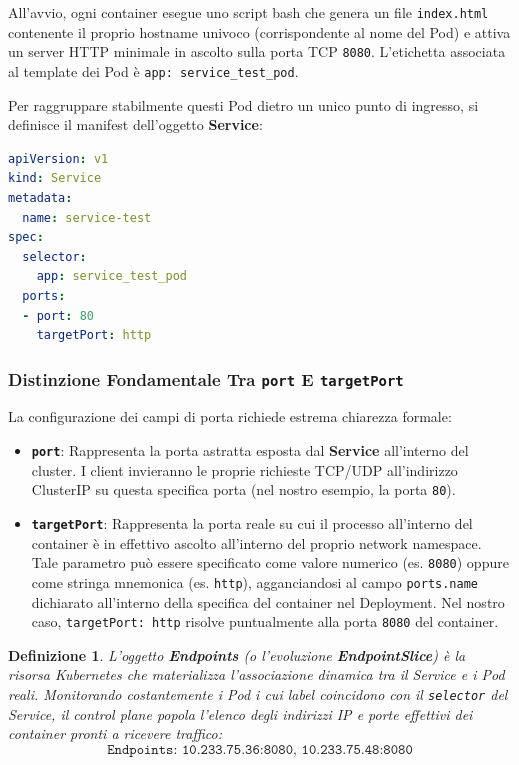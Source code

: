 \documentclass[11pt, a4paper]{article}
\newtheorem{theorem}{Definizione}
\begin{document}
All'avvio, ogni container esegue uno script bash che genera un file \texttt{index.html} contenente il proprio hostname univoco (corrispondente al nome del Pod) e attiva un server HTTP minimale in ascolto sulla porta TCP \texttt{8080}. L'etichetta associata al template dei Pod è \texttt{app: service\_test\_pod}.

Per raggruppare stabilmente questi Pod dietro un unico punto di ingresso, si definisce il manifest dell'oggetto \textbf{Service}:

\begin{lstlisting}[language=yaml, caption={Manifest del Service ClusterIP associato (\texttt{deployment-service-test.yml})}]
apiVersion: v1
kind: Service
metadata:
  name: service-test
spec:
  selector:
    app: service_test_pod
  ports:
  - port: 80
    targetPort: http
\end{lstlisting}

\subsubsection{Distinzione Fondamentale Tra \texttt{port} E \texttt{targetPort}}
La configurazione dei campi di porta richiede estrema chiarezza formale:
\begin{itemize}[noitemsep]
    \item \textbf{\texttt{port}}: Rappresenta la porta astratta esposta dal \textbf{Service} all'interno del cluster. I client invieranno le proprie richieste TCP/UDP all'indirizzo ClusterIP su questa specifica porta (nel nostro esempio, la porta \texttt{80}).
    \item \textbf{\texttt{targetPort}}: Rappresenta la porta reale su cui il processo all'interno del container è in effettivo ascolto all'interno del proprio network namespace. Tale parametro può essere specificato come valore numerico (es. \texttt{8080}) oppure come stringa mnemonica (es. \texttt{http}), agganciandosi al campo \texttt{ports.name} dichiarato all'interno della specifica del container nel Deployment. Nel nostro caso, \texttt{targetPort: http} risolve puntualmente alla porta \texttt{8080} del container.
\end{itemize}

\begin{theorem}
L'oggetto \textbf{Endpoints} (o l'evoluzione \textbf{EndpointSlice}) è la risorsa Kubernetes che materializza l'associazione dinamica tra il Service e i Pod reali. Monitorando costantemente i Pod i cui label coincidono con il \texttt{selector} del Service, il control plane popola l'elenco degli indirizzi IP e porte effettivi dei container pronti a ricevere traffico:
\[
    \texttt{Endpoints: 10.233.75.36:8080, 10.233.75.48:8080}
\]
\end{theorem}
\end{document}
